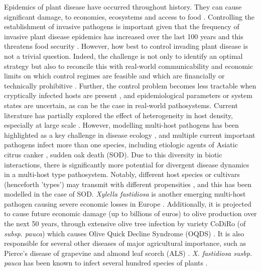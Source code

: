 \documentclass[11pt,letterpaper]{article}
\begin{document}
Epidemics of plant disease have occurred throughout history. They can cause significant damage, to economies, ecosystems and access to food \cite{Boyd2013}. Controlling the establishment of invasive pathogens is important given that the frequency of invasive plant disease epidemics has increased over the last 100 years \cite{Montgomery2023} and this threatens food security \cite{Fones2020} \cite{Ristaino2021}. However, how best to control invading plant disease is not a trivial question. Indeed, the challenge is not only to identify an optimal strategy but also to reconcile this with real-world communicability and economic limits on which control regimes are feasible and which are financially or technically prohibitive \cite{Cunniffe2016}. Further, the control problem becomes less tractable when cryptically infected hosts are present \cite{Filipe2012}, and epidemiological parameters \cite{Cunniffe2015} or system states \cite{Dybiec2004} are uncertain, as can be the case in real-world pathosystems. Current literature has partially explored the effect of heterogeneity in host density, especially at large scale \cite{Meentemeyer2011}. However, modelling multi-host pathogens has been highlighted as a key challenge in disease ecology \cite{Buhnerkempe2015}, and multiple current important pathogens infect more than one species, including etiologic agents of Asiatic citrus canker \cite{Pruvost2022}, sudden oak death (SOD)\cite{Grunwald2008}. Due to this diversity in biotic interactions, there is significantly more potential for divergent disease dynamics in a multi-host type pathosystem. Notably, different host species or cultivars (henceforth 'types') may transmit with different propensities \cite{NdeffoMbah2010}, and this has been modelled in the case of SOD. \emph{Xylella fastidiosa} is another emerging multi-host pathogen causing severe economic losses in Europe \cite{Bodino2021} \cite{Martelli2016}. Additionally, it is projected to cause future economic damage (up to billions of euros) to olive production over the next 50 years, through extensive olive tree infection by variety CoDiRo (of \emph{subsp. pauca}) which causes Olive Quick Decline Syndrome (OQDS) \cite{Marcelletti2016} \cite{Schneider2020}. It is also responsible for several other diseases of major agricultural importance, such as Pierce's disease of grapevine \cite{GimenezRomero2024} and almond leaf scorch (ALS) \cite{Gibin2023}. \emph{X. fastidiosa susbp. pauca} has been known to infect several hundred species of plants \cite{Gibin2023}.
\end{document}
